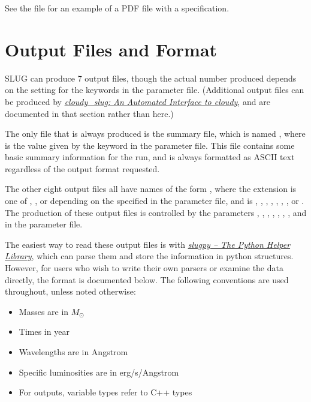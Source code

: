 \documentclass[letterpaper,10pt,english]{sphinxmanual}
\begin{document}
See the file  for an example of a PDF file with a  specification.


\chapter{Output Files and Format}
\label{output:output-files-and-format}\label{output::doc}\label{output:sec-output}
SLUG can produce 7 output files, though the actual number produced depends on the setting for the  keywords in the parameter file. (Additional output files can be produced by {\hyperref[cloudy:sec\string-cloudy\string-slug]{\emph{cloudy\_slug: An Automated Interface to cloudy}}}, and are documented in that section rather than here.)

The only file that is always produced is the summary file, which is named , where  is the value given by the  keyword in the parameter file. This file contains some basic summary information for the run, and is always formatted as ASCII text regardless of the output format requested.

The other eight output files all have names of the form , where the extension  is one of , , or  depending on the  specified in the parameter file, and  is , , , , , , , or . The production of these output files is controlled by the parameters , , , , , , , and  in the parameter file.

The easiest way to read these output files is with {\hyperref[slugpy:sec\string-slugpy]{\emph{slugpy -- The Python Helper Library}}}, which can parse them and store the information in python structures. However, for users who wish to write their own parsers or examine the data directly, the format is documented below. The following conventions are used throughout, unless noted otherwise:
\begin{itemize}
\item {} 
Masses are in \(M_\odot\)

\item {} 
Times in year

\item {} 
Wavelengths are in Angstrom

\item {} 
Specific luminosities are in erg/s/Angstrom

\item {} 
For  outputs, variable types refer to C++ types

\end{itemize}
\end{document}
